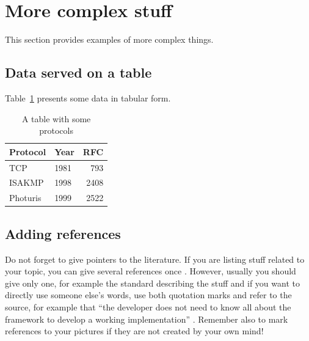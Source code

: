 \documentclass[article]{aaltoseries}
\begin{document}


\section{More complex stuff}

This section provides examples of more complex things.




\subsection{Data served on a table}


Table~\ref{tab:mytable1} presents some data in tabular form. 

\begin{table}[t!]
  \begin{center}
    \begin{tabular}{|l|lr|}
    \hline
    Protocol & Year &  RFC \\
    \hline
    TCP      & 1981 &  793 \\
    ISAKMP   & 1998 & 2408 \\
    Photuris & 1999 & 2522 \\
    \hline
    \end{tabular}
    \caption{A table with some protocols}
    \label{tab:mytable1}
  \end{center}
\end{table}




\subsection{Adding references}
\label{sec:references}

Do not forget to give pointers to the literature. If you are listing
stuff related to your topic, you can give several references once
\cite{Com00,HTS03,Nik99}. However, usually you should give only one, for example the standard describing the stuff \cite{RFC2408} and if you want to directly use someone else's words, use both quotation marks and refer to the source, for example that ``the developer does not need to know all about the framework to develop a working implementation'' \cite{Suo98}. Remember also to mark references to your pictures if they are not created by your own mind!
\end{document}
